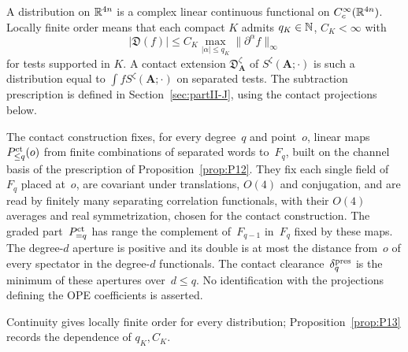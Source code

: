 \begin{definition}\label{def:contacts}
A distribution on $\mathbb{R}^{4n}$ is a complex linear continuous functional on $C_c^\infty(\mathbb{R}^{4n})$. Locally finite order means that each compact $K$ admits $q_K\in\mathbb{N}$, $C_K<\infty$ with
\begin{equation}\label{eq:contact-order}
|\mathfrak D(f)|\le C_K\max_{|\alpha|\le q_K}\|\partial^\alpha f\|_\infty
\end{equation}
for tests supported in $K$. A contact extension $\mathfrak D_{\boldsymbol A}^\zeta$ of $S^\zeta(\boldsymbol A;\cdot)$ is such a distribution equal to $\int fS^\zeta(\boldsymbol A;\cdot)$ on separated tests. The subtraction prescription is defined in Section~\ref{sec:partII-J}, using the contact projections below.

The contact construction fixes, for every degree~$q$ and point~$o$, linear maps~$P^{\rm ct}_{\le q}(o)$ from finite combinations of separated words to~$F_q$, built on the channel basis of the prescription of Proposition~\ref{prop:P12}. They fix each single field of~$F_q$ placed at~$o$, are covariant under translations, $O(4)$ and conjugation, and are read by finitely many separating correlation functionals, with their $O(4)$ averages and real symmetrization, chosen for the contact construction. The graded part~$P^{\rm ct}_{=q}$ has range the complement of~$F_{q-1}$ in~$F_q$ fixed by these maps. The degree-$d$ aperture is positive and its double is at most the distance from~$o$ of every spectator in the degree-$d$ functionals. The contact clearance~$\delta_q^{\rm pres}$ is the minimum of these apertures over~$d\le q$. No identification with the projections defining the OPE coefficients is asserted.
\end{definition}

Continuity gives locally finite order for every distribution; Proposition~\ref{prop:P13} records the dependence of $q_K,C_K$.
